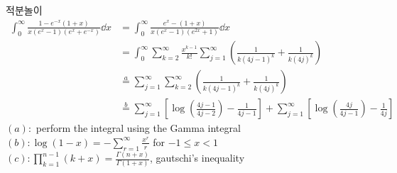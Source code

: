 \documentclass[9pt,t,aspectratio=169]{beamer}
\begin{document}
\begin{frame}[allowframebreaks]{적분놀이}
\begin{align*}
    \int_0^{\infty} \frac{1- e^{-x}(1+x)}{x(e^x-1)(e^x+e^{-x})} \dd{x} &= \int_0^{\infty} \frac{e^{x} - (1+x)}{x(e^x-1)(e^{2x}+1)} \dd{x} \\ 
    &= \int_0^{\infty} \sum_{k=2}^{\infty} \frac{x^{k-1}}{k!} \sum_{j=1}^{\infty} \left( \frac{1}{k(4j-1)^k} + \frac{1}{k (4j)^k} \right)  \\ 
    &\overset{a}{=} \sum_{j=1}^{\infty} \sum_{k=2}^{\infty} \left( \frac{1}{ k (4j-1)^k} + \frac{1}{k (4j)^k} \right)  \\
    &\overset{b}{=} \sum_{j=1}^{\infty} \left[ \log \left( \frac{4j-1}{4j-2} \right) - \frac{1}{4j-1}\right] + 
    \sum_{j=1}^{\infty} \left[ \log \left(\frac{4j}{4j-1}\right) - \frac{1}{4j}\right]   
\end{align*}
$(a):$ perform the integral using the Gamma integral \\
$(b): \log (1-x) = - \sum_{r=1}^{\infty} \frac{x^r}{r}$ for $-1 \leq x <1$ \\ 
$(c): \prod_{k=1}^{n-1} (k+x) = \frac{\Gamma(n+x)}{\Gamma(1+x)}$, gautschi's inequality
\end{frame}
\end{document}
